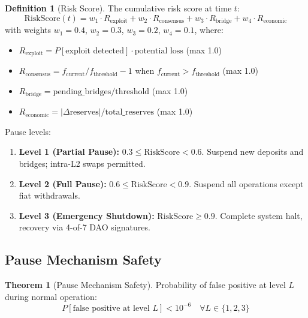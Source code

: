 \documentclass[12pt,a4paper]{article}
\theoremstyle{definition}
\newtheorem{definition}{Definition}[section]
\newtheorem{theorem}{Theorem}[section]
\theoremstyle{remark}
\begin{document}
\begin{definition}[Risk Score]
The cumulative risk score at time $t$:
\begin{equation}
\text{RiskScore}(t) = w_1 \cdot R_{\text{exploit}} + w_2 \cdot R_{\text{consensus}} + w_3 \cdot R_{\text{bridge}} + w_4 \cdot R_{\text{economic}}
\end{equation}
with weights $w_1 = 0.4$, $w_2 = 0.3$, $w_3 = 0.2$, $w_4 = 0.1$, where:
\begin{itemize}[nosep]
    \item $R_{\text{exploit}} = P[\text{exploit detected}] \cdot \text{potential loss}$ (max 1.0)
    \item $R_{\text{consensus}} = f_{\text{current}} / f_{\text{threshold}} - 1$ when $f_{\text{current}} > f_{\text{threshold}}$ (max 1.0)
    \item $R_{\text{bridge}} = \text{pending\_bridges} / \text{threshold}$ (max 1.0)
    \item $R_{\text{economic}} = |\Delta\text{reserves}| / \text{total\_reserves}$ (max 1.0)
\end{itemize}
\end{definition}

Pause levels:
\begin{enumerate}[nosep]
    \item \textbf{Level 1 (Partial Pause):} $0.3 \leq \text{RiskScore} < 0.6$. Suspend new deposits and bridges; intra-L2 swaps permitted.
    \item \textbf{Level 2 (Full Pause):} $0.6 \leq \text{RiskScore} < 0.9$. Suspend all operations except fiat withdrawals.
    \item \textbf{Level 3 (Emergency Shutdown):} $\text{RiskScore} \geq 0.9$. Complete system halt, recovery via 4-of-7 DAO signatures.
\end{enumerate}

\subsection{Pause Mechanism Safety}

\begin{theorem}[Pause Mechanism Safety]
\label{thm:pause-safety}
Probability of false positive at level $L$ during normal operation:
\begin{equation}
P[\text{false positive at level } L] < 10^{-6} \quad \forall L \in \{1, 2, 3\}
\end{equation}
\end{theorem}
\end{document}
